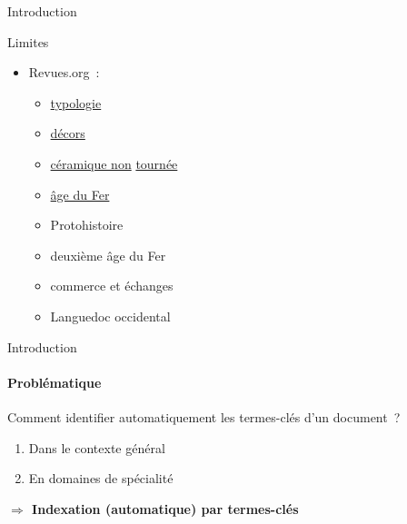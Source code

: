 \begin{frame}[t]{Introduction}
\begin{alertblock}{Limites}
\begin{itemize}
{\begin{itemize}
\begin{multicols}{3}
\begin{itemize}
              \item{distribution}
              \item{cartographie}
              \item{habitat}
              \item{site fortifié}
              \item{identification}
              \item{étude du matériel}
            \end{itemize}
          \end{multicols}
          \vspace{-.66em}
          \item{Revues.org~:}
          \vspace{-1.5em}
          \begin{multicols}{3}
            \begin{itemize}
              \item{\underline{typologie}}
              \item{\underline{décors}}
              \item{\underline{céramique non} \underline{tournée}}
              \item{\underline{âge du Fer}}
              \item{Protohistoire}
              \item{deuxième âge du Fer}
              \item{commerce et échanges}
              \item{Languedoc occidental}
            \end{itemize}
          \end{multicols}
          \vspace{-1em}
        \end{itemize}
      }{
      }
    \end{itemize}
  \end{alertblock}
\end{frame}

\begin{frame}{Introduction}\framesubtitle{Problématique}
  Comment identifier automatiquement les termes-clés d'un document~?
  \begin{enumerate}
    \item{Dans le contexte général}
    \item{En domaines de spécialité}
  \end{enumerate}

  \vspace{1em}

  \large\textbf{$\Rightarrow$ Indexation (automatique) par termes-clés}
\end{frame}

